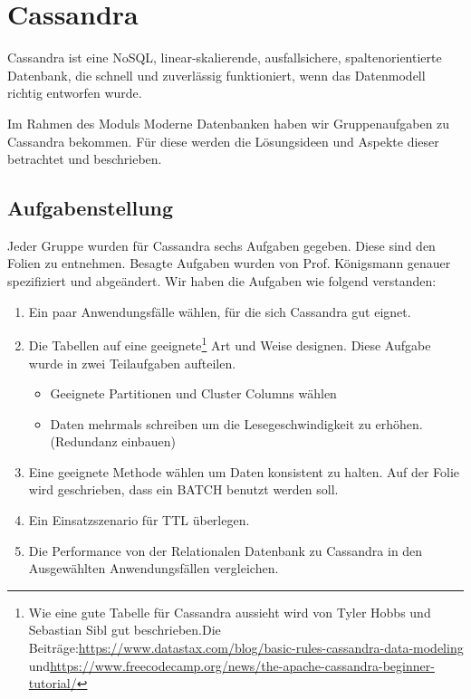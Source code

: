 
\clearpage

\section{Cassandra}
Cassandra ist eine NoSQL, linear-skalierende, ausfallsichere, spaltenorientierte Datenbank, die schnell und zuverlässig funktioniert, wenn das Datenmodell richtig entworfen wurde. 

\vspace{6pt}

Im Rahmen des Moduls Moderne Datenbanken haben wir Gruppenaufgaben zu Cassandra bekommen. Für diese werden die Lösungsideen und Aspekte dieser betrachtet und beschrieben. 

\vspace{18pt}

\subsection{Aufgabenstellung}
Jeder Gruppe wurden für Cassandra sechs Aufgaben gegeben. Diese sind den Folien zu entnehmen. Besagte Aufgaben wurden von Prof. Königsmann genauer spezifiziert und abgeändert. Wir haben die Aufgaben wie folgend verstanden:

\begin{enumerate}
	\item Ein paar Anwendungsfälle wählen, für die sich Cassandra gut eignet.
	\item Die Tabellen auf eine geeignete\footnote{Wie eine gute Tabelle für Cassandra aussieht wird von Tyler Hobbs und Sebastian Sibl gut beschrieben.\newline Die Beiträge:\newline \href{https://www.datastax.com/blog/basic-rules-cassandra-data-modeling}{https://www.datastax.com/blog/basic-rules-cassandra-data-modeling} und\newline \href{https://www.freecodecamp.org/news/the-apache-cassandra-beginner-tutorial/}{https://www.freecodecamp.org/news/the-apache-cassandra-beginner-tutorial/}} Art und Weise designen. Diese Aufgabe wurde in zwei Teilaufgaben aufteilen. 
	\begin{itemize}
		\item Geeignete Partitionen und Cluster Columns wählen
		\item Daten mehrmals schreiben um die Lesegeschwindigkeit zu erhöhen. (Redundanz einbauen)
	\end{itemize}
	\item Eine geeignete Methode wählen um Daten konsistent zu halten. Auf der Folie wird geschrieben, dass ein BATCH benutzt werden soll. 
	\item Ein Einsatzszenario für TTL überlegen.
	\item Die Performance von der Relationalen Datenbank zu Cassandra in den Ausgewählten Anwendungsfällen vergleichen.
\end{enumerate}

